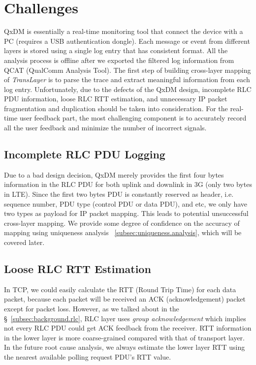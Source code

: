 \section{Challenges}
\label{sec:challenge}

QxDM is essentially a real-time monitoring tool that connect the device with a PC (requires a USB authentication dongle). Each message or event from different layers is stored using a single log entry that has consistent format. All the analysis process is offline after we exported the filtered log information from QCAT (QualComm Analysis Tool). The first step of building cross-layer mapping of \textit{TransLayer} is to parse the trace and extract meaningful information from each log entry. Unfortunately, due to the defects of the QxDM design, incomplete RLC PDU information, loose RLC RTT estimation, and unnecessary IP packet fragmentation and duplication should be taken into consideration. For the real-time user feedback part, the most challenging component is to accurately record all the user feedback and minimize the number of incorrect signals.

\subsection{Incomplete RLC PDU Logging}
\label{subsec:partial.logging}
Due to a bad design decision, QxDM merely provides the first four bytes information in the RLC PDU for both uplink and downlink in 3G (only two bytes in LTE). Since the first two bytes PDU is constantly reserved as header, i.e. sequence number, PDU type (control PDU or data PDU), and etc, we only have two types as payload for IP packet mapping. This leads to potential unsuccessful cross-layer mapping. We provide some degree of confidence on the accuracy of mapping using uniqueness analysis ~\ref{subsec:uniqueness.analysis}, which will be covered later.

\subsection{Loose RLC RTT Estimation}
\label{subsec:loose.rlc.rtt.estimation}
In TCP, we could easily calculate the RTT (Round Trip Time) for each data packet, because each packet will be received an ACK (acknowledgement) packet except for packet loss. However, as we talked about in the \S~\ref{subsec:background.rlc}, RLC layer uses \textit{group acknowledgement} which implies not every RLC PDU could get ACK feedback from the receiver. RTT information in the lower layer is more coarse-grained compared with that of transport layer. In the future root cause analysis, we always estimate the lower layer RTT using the nearest available polling request PDU's RTT value.

